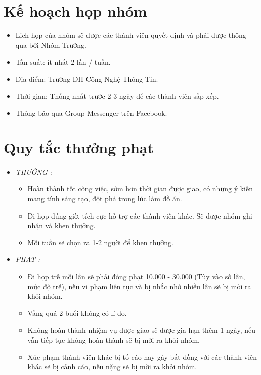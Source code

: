\documentclass[12pt]{article}
\begin{document}
\section{Kế hoạch họp nhóm}
\begin{itemize}
    \item Lịch họp của nhóm sẽ được các thành viên quyết định và phải được thông qua bởi Nhóm Trưởng.
    \item Tần suất: ít nhất 2 lần / tuần.
    \item Địa điểm: Trường ĐH Công Nghệ Thông Tin.
    \item Thời gian: Thống nhất trước 2-3 ngày để các thành viên sắp xếp.
    \item Thông báo qua Group Messenger trên Facebook.
\end{itemize}
\section{Quy tắc thưởng phạt}
\begin{itemize}
\item \textit{THƯỞNG :}
\begin{itemize}
    \item Hoàn thành tốt công việc, sớm hơn thời gian được giao, có những ý kiến mang tính sáng tạo, đột phá trong lúc làm đồ án.
    \item Đi họp đúng giờ, tích cực hỗ trợ các thành viên khác. Sẽ được nhóm ghi nhận và khen thưởng.
    \item Mỗi tuần sẽ chọn ra 1-2 người để khen thưởng.
    \end{itemize}
\item \textit{PHẠT :} 
    \begin{itemize}
    \item Đi họp trễ mỗi lần sẽ phải đóng phạt 10.000 - 30.000 (Tùy vào số lần, mức độ trễ), nếu vi phạm liên tục và bị nhắc nhở nhiều lần sẽ bị mời ra khỏi nhóm.
    \item Vắng quá 2 buổi không có lí do.
    \item Không hoàn thành nhiệm vụ được giao sẽ được gia hạn thêm 1 ngày, nếu vẫn tiếp tục không hoàn thành sẽ bị mời ra khỏi nhóm.
    \item Xúc phạm thành viên khác bị tố cáo hay gây bất đồng với các thành viên khác sẽ bị cảnh cáo, nếu nặng sẽ bị mời ra khỏi nhóm.
    \end{itemize}
\end{itemize}
\end{document}
